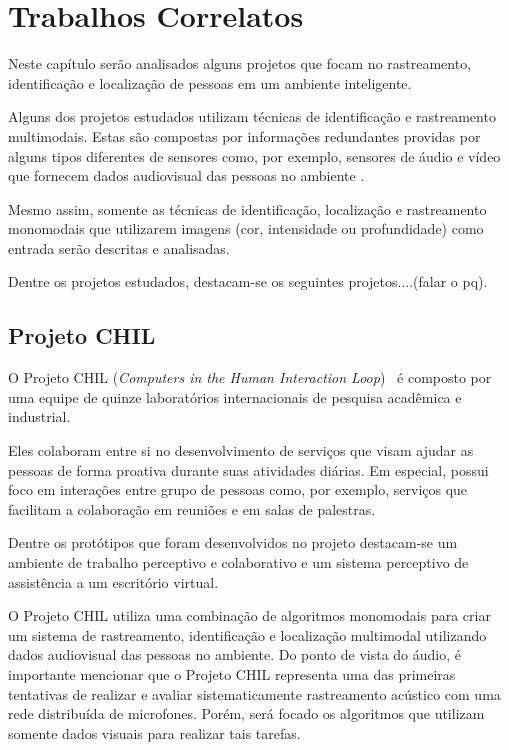 \chapter{Trabalhos Correlatos}

Neste capítulo serão analisados alguns projetos que focam no rastreamento, identificação e localização de pessoas em um ambiente inteligente. 

Alguns dos projetos estudados utilizam técnicas de identificação e rastreamento multimodais. Estas são compostas por informações redundantes providas por alguns tipos diferentes de sensores como, por exemplo, sensores de áudio e vídeo que fornecem dados audiovisual  das pessoas no ambiente .

Mesmo assim, somente as técnicas de identificação, localização e rastreamento monomodais que utilizarem imagens (cor, intensidade ou profundidade) como entrada serão descritas e analisadas.

Dentre os projetos estudados, destacam-se os seguintes projetos....(falar o pq).

\section{Projeto CHIL}

O Projeto CHIL (\textit{Computers in the Human Interaction Loop})~\cite{chil, computerschil} é composto por uma equipe de quinze laboratórios internacionais de pesquisa acadêmica e industrial.

Eles colaboram entre si no desenvolvimento de serviços que visam ajudar as pessoas de forma proativa durante suas atividades diárias. Em especial, possui foco em interações entre grupo de pessoas como, por exemplo, serviços que facilitam a colaboração em reuniões e em salas de palestras. 

Dentre os protótipos que foram desenvolvidos no projeto destacam-se um ambiente de trabalho perceptivo e colaborativo e um sistema perceptivo de assistência a um escritório virtual.

O Projeto CHIL utiliza uma combinação de algoritmos monomodais para criar um sistema de rastreamento, identificação e localização multimodal utilizando dados audiovisual das pessoas no ambiente. Do ponto de vista do áudio, é importante mencionar que o Projeto CHIL representa uma das primeiras tentativas de realizar e avaliar sistematicamente rastreamento acústico com uma rede distribuída de microfones. Porém, será focado os algoritmos que utilizam somente dados visuais para realizar tais tarefas.

